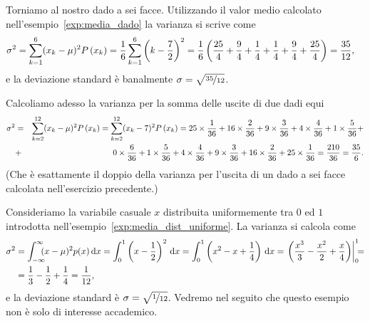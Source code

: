 \begin{examplebox}
  \begin{example}\label{exp:varianza_dado}
    Torniamo al nostro dado a sei facce. Utilizzando il valor medio calcolato
    nell'esempio~\ref{exp:media_dado} la varianza si scrive come
    \begin{align*}
      \sigma^2 & = \sum_{k = 1}^6(x_k - \mu)^2 \displaystyle P\left(x_k\right) =
      \frac{1}{6}\sum_{k = 1}^6\left( k - \frac{7}{2} \right)^2 =
      \frac{1}{6} \left(\frac{25}{4} + \frac{9}{4} + \frac{1}{4} +
      \frac{1}{4} + \frac{9}{4} + \frac{25}{4} \right) = \frac{35}{12},
    \end{align*}
    e la deviazione standard è banalmente $\sigma = \sqrt{\nicefrac{35}{12}}$.
  \end{example}

  \begin{example}\label{exp:varianza_due_dadi}
    Calcoliamo adesso la varianza per la somma delle uscite di due dadi
    equi
    \begin{eqnarray*}
      \sigma^2 &=& \sum_{k = 2}^{12}(x_k - \mu)^2 \displaystyle P\left(x_k\right)  =
      \sum_{k = 2}^{12} (x_k - 7)^2 \displaystyle P\left(x_k\right) =
      25 \times \frac{1}{36} + 16 \times \frac{2}{36} +
      9 \times \frac{3}{36} + 4 \times \frac{4}{36} + 1 \times \frac{5}{36} +\\
      &+& 0 \times \frac{6}{36} + 1 \times \frac{5}{36} +
      4 \times \frac{4}{36} + 9 \times \frac{3}{36} + 16 \times \frac{2}{36} +
      25 \times \frac{1}{36} = \frac{210}{36} = \frac{35}{6}.
    \end{eqnarray*}
    (Che è esattamente il doppio della varianza per l'uscita di un dado a sei
    facce calcolata nell'esercizio precedente.)
  \end{example}

  \begin{example}\label{exp:varianza_dist_uniforme}
    Consideriamo la variabile casuale $x$ distribuita uniformemente tra $0$ ed
    $1$ introdotta nell'esempio~\ref{exp:media_dist_uniforme}. La varianza
    si calcola come
    \begin{align*}
      \sigma^2 & = \intinf (x - \mu)^2p(x)\diff =
      \int_{0}^{1} \left(x - \frac{1}{2}\right)^2 \diff =
      \int_{0}^{1} \left(x^2 - x + \frac{1}{4}\right) \diff =
      \eval{\left(\frac{x^3}{3} - \frac{x^2}{2} + \frac{x}{4}\right)}{0}{1} =\\
      &= \frac{1}{3} - \frac{1}{2} + \frac{1}{4} = \frac{1}{12},
    \end{align*}
    e la deviazione standard è $\sigma = \sqrt{\nicefrac{1}{12}}$.
    Vedremo nel seguito che questo esempio non è solo di interesse accademico.
  \end{example}
\end{examplebox}

